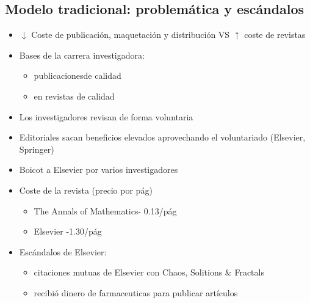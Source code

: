 \documentclass[a0,portrait]{a0poster}
\begin{document}
\begin{multicols}{2}
  \section*{Modelo tradicional: problemática y escándalos}
  \begin{itemize}
  \item $\downarrow$ Coste de publicación, maquetación y distribución VS $\uparrow$ coste de revistas
  \item Bases de la carrera investigadora:
    \begin{itemize}
    \item publicacionesde calidad 
    \item en revistas de calidad
    \end{itemize}
  \item Los investigadores revisan de forma voluntaria
  \item Editoriales sacan beneficios elevados aprovechando el voluntariado (Elsevier, Springer) 
  \item Boicot a Elsevier por varios investigadores
  \item Coste de la revista (precio por pág)
 \begin{itemize}
    \item The Annals of Mathematics- 0.13/pág
    \item Elsevier -1.30/pág
    \end{itemize}
  \item Escándalos de Elsevier:
    \begin{itemize}
  	\item citaciones mutuas de Elsevier con  Chaos, Solitions \& Fractals
  	\item recibió dinero de farmaceuticas para publicar artículos
  	\end{itemize}
  \end{itemize}


\end{multicols}
\end{document}
